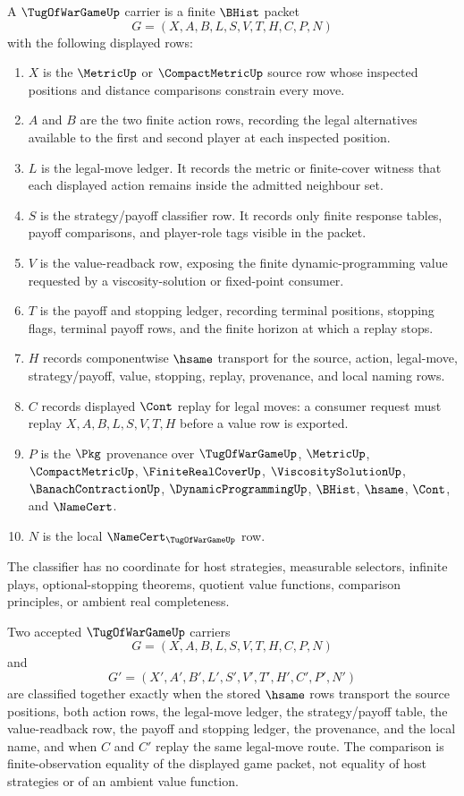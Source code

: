 \begin{definition}
\label{def:tug-of-war-game-carrier}
A $\TugOfWarGameUp$ carrier is a finite $\BHist$ packet
$$
G=(X,A,B,L,S,V,T,H,C,P,N)
$$
with the following displayed rows:
\begin{enumerate}
\item $X$ is the $\MetricUp$ or $\CompactMetricUp$ source row whose inspected positions and distance comparisons constrain every move.
\item $A$ and $B$ are the two finite action rows, recording the legal alternatives available to the first and second player at each inspected position.
\item $L$ is the legal-move ledger. It records the metric or finite-cover witness that each displayed action remains inside the admitted neighbour set.
\item $S$ is the strategy/payoff classifier row. It records only finite response tables, payoff comparisons, and player-role tags visible in the packet.
\item $V$ is the value-readback row, exposing the finite dynamic-programming value requested by a viscosity-solution or fixed-point consumer.
\item $T$ is the payoff and stopping ledger, recording terminal positions, stopping flags, terminal payoff rows, and the finite horizon at which a replay stops.
\item $H$ records componentwise $\hsame$ transport for the source, action, legal-move, strategy/payoff, value, stopping, replay, provenance, and local naming rows.
\item $C$ records displayed $\Cont$ replay for legal moves: a consumer request must replay $X,A,B,L,S,V,T,H$ before a value row is exported.
\item $P$ is the $\Pkg$ provenance over $\TugOfWarGameUp$, $\MetricUp$, $\CompactMetricUp$, $\FiniteRealCoverUp$, $\ViscositySolutionUp$, $\BanachContractionUp$, $\DynamicProgrammingUp$, $\BHist$, $\hsame$, $\Cont$, and $\NameCert$.
\item $N$ is the local $\NameCert_{\TugOfWarGameUp}$ row.
\end{enumerate}
The classifier has no coordinate for host strategies, measurable selectors, infinite plays, optional-stopping theorems, quotient value functions, comparison principles, or ambient real completeness.
\end{definition}

\begin{definition}
\label{def:tug-of-war-game-strategy-payoff-classifier}
Two accepted $\TugOfWarGameUp$ carriers
$$
G=(X,A,B,L,S,V,T,H,C,P,N)
$$
and
$$
G'=(X',A',B',L',S',V',T',H',C',P',N')
$$
are classified together exactly when the stored $\hsame$ rows transport the source positions, both action rows, the legal-move ledger, the strategy/payoff table, the value-readback row, the payoff and stopping ledger, the provenance, and the local name, and when $C$ and $C'$ replay the same legal-move route. The comparison is finite-observation equality of the displayed game packet, not equality of host strategies or of an ambient value function.
\end{definition}


